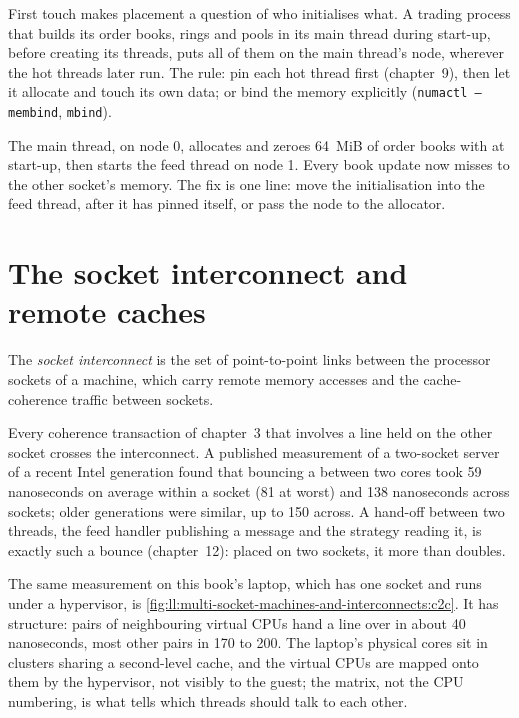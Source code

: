 First touch makes placement a question of who initialises what. A trading process that builds its order books, rings
and pools in its main thread during start-up, before creating its threads, puts all of them on the main thread's node,
wherever the hot threads later run. The rule: pin each hot thread first (chapter~9), then let it allocate and touch its
own data; or bind the memory explicitly (\texttt{numactl --membind}, \texttt{mbind}).

\begin{example}\label{ex:ll:multi-socket-machines-and-interconnects:touch}
The main thread, on node 0, allocates and zeroes 64~MiB of order books with  at start-up, then starts the
feed thread on node 1. Every book update now misses to the other socket's memory. The fix is one line: move the
initialisation into the feed thread, after it has pinned itself, or pass the node to the allocator.
\end{example}

\section{The socket interconnect and remote caches}

\begin{definition}\label{def:ll:multi-socket-machines-and-interconnects:link}
The \emph{socket interconnect} is the set of point-to-point links between the processor
sockets of a machine, which carry remote memory accesses and the cache-coherence traffic between sockets.
\end{definition}

Every coherence transaction of chapter~3 that involves a line held on the other socket crosses the interconnect. A
published measurement of a two-socket server of a recent Intel generation found that bouncing a  between two
cores took 59 nanoseconds on average within a socket (81 at worst) and 138 nanoseconds across sockets; older
generations were similar, up to 150 across. A hand-off between two threads, the feed handler publishing a message and
the strategy reading it, is exactly such a bounce (chapter~12): placed on two sockets, it more than doubles.

The same measurement on this book's laptop, which has one socket and runs under a hypervisor, is
\cref{fig:ll:multi-socket-machines-and-interconnects:c2c}. It has structure: pairs of neighbouring virtual CPUs hand a
line over in about 40 nanoseconds, most other pairs in 170 to 200. The laptop's physical cores sit in clusters sharing
a second-level cache, and the virtual CPUs are mapped onto them by the hypervisor, not visibly to the guest; the
matrix, not the CPU numbering, is what tells which threads should talk to each other.

